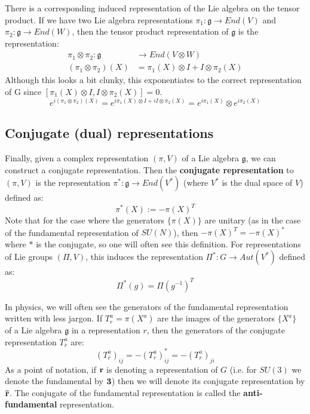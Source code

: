 \documentclass[11pt, oneside]{article}   	%
\theoremstyle{definition}
\begin{document}
There is a corresponding induced representation of the Lie algebra on the tensor product. If we have two 
Lie algebra representations $\pi_1 : \mathfrak g\rightarrow End(V)$ and $\pi_2 : \mathfrak g\rightarrow End(W)$, 
then the tensor product representation of $\mathfrak g$ is the representation:
\begin{align}
	\pi_1\otimes\pi_2: \mathfrak g &\rightarrow End(V\otimes W)\\
	(\pi_1\otimes\pi_2)(X) &= \pi_1(X)\otimes I + I\otimes\pi_2(X)
\end{align}
Although this looks a bit clunky, this exponentiates to the correct representation of G since $[\pi_1(X)\otimes I, I\otimes\pi_2(X)] = 0$.
\begin{equation}
	e^{i(\pi_1\otimes\pi_2)(X)} = e^{i\pi_1(X)\otimes I + iI\otimes\pi_2(X)} = e^{i\pi_1(X)}\otimes e^{i\pi_2(X)}
\end{equation}

\subsection{Conjugate (dual) representations}

Finally, given a complex representation $(\pi, V)$ of a Lie algebra $\mathfrak g$, we can construct a conjugate representation. 
Then the \textbf{conjugate representation} to $(\pi, V)$ is the representation $\pi^* : \mathfrak g\rightarrow End(V^*)$ (where 
$V^*$ is the dual space of $V$) defined as:
\begin{equation}
	\pi^*(X) := -\pi(X)^T
\end{equation}
Note that for the case where the generators $\{\pi(X)\}$ are unitary (as in the case of the fundamental representation of 
$SU(N)$), then $-\pi(X)^T = -\pi(X)^*$ where $*$ is the conjugate, so one will often see this definition. For representations of 
Lie groups $(\Pi, V)$, this induces the representation $\Pi^* : G\rightarrow Aut(V^*)$ defined as:
\begin{equation}
	\Pi^*(g) = \Pi(g^{-1})^T
\end{equation}

In physics, we will often see the generators of the fundamental representation written with less jargon. If $T^a_r = \pi(X^a)$ are 
the images of the generators $\{X^a\}$ of a Lie algebra $\mathfrak g$ in a representation $r$, then the generators of the conjugate 
representation $T^a_{\bar r}$ are:
\begin{equation}
	(T^a_{\bar r})_{ij} = - (T^a_r)^*_{ij} = -(T^a_r)_{ji}
\end{equation}
As a point of notation, if $\bf{r}$ is denoting a representation of $G$ (i.e. for $SU(3)$ we denote the fundamental by $\bf{3}$) then 
we will denote its conjugate representation by $\bf{\bar r}$. The conjugate of the fundamental representation is called the 
\textbf{anti-fundamental} representation. 
\end{document}
